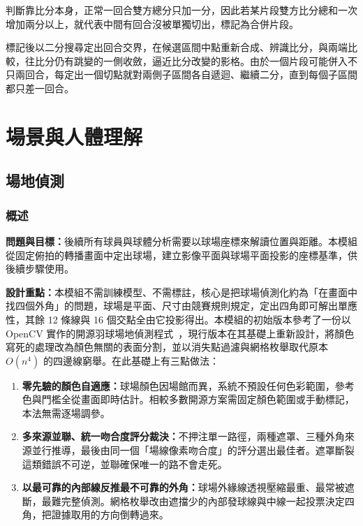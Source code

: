 判斷靠比分本身，正常一回合雙方總分只加一分，因此若某片段雙方比分總和一次增加兩分以上，就代表中間有回合沒被單獨切出，標記為合併片段。

標記後以二分搜尋定出回合交界，在候選區間中點重新合成、辨識比分，與兩端比較，往比分仍有跳變的一側收斂，逼近比分改變的影格。由於一個片段可能併入不只兩回合，每定出一個切點就對兩側子區間各自遞迴、繼續二分，直到每個子區間都只差一回合。

\section{場景與人體理解}
\label{sec:scene-understanding}

\subsection{場地偵測}
\label{sec:court-detection}

\subsubsection{概述}

\textbf{問題與目標：}後續所有球員與球體分析需要以球場座標來解讀位置與距離。本模組從固定俯拍的轉播畫面中定出球場，建立影像平面與球場平面投影的座標基準，供後續步驟使用。

\textbf{設計重點：}本模組不需訓練模型、不需標註，核心是把球場偵測化約為「在畫面中找四個外角」的問題，球場是平面、尺寸由競賽規則規定，定出四角即可解出單應性，其餘 12 條線與 16 個交點全由它投影得出。本模組的初始版本參考了一份以 OpenCV 實作的開源羽球場地偵測程式~\cite{badmintoncv}，現行版本在其基礎上重新設計，將顏色寫死的處理改為顏色無關的表面分割，並以消失點過濾與網格枚舉取代原本 $O(n^4)$ 的四邊線窮舉。在此基礎上有三點做法：

\begin{enumerate}
  \item \textbf{零先驗的顏色自適應：}球場顏色因場館而異，系統不預設任何色彩範圍，參考色與門檻全從畫面即時估計。相較多數開源方案需固定顏色範圍或手動標記，本法無需逐場調參。
  \item \textbf{多來源並聯、統一吻合度評分裁決：}不押注單一路徑，兩種遮罩、三種外角來源並行推導，最後由同一個「場線像素吻合度」的評分選出最佳者。遮罩斷裂這類錯誤不可逆，並聯確保唯一的路不會走死。
  \item \textbf{以最可靠的內部線反推最不可靠的外角：}球場外緣線透視壓縮最重、最常被遮斷，最難完整偵測。網格枚舉改由遮擋少的內部發球線與中線一起投票決定四角，把證據取用的方向倒轉過來。
\end{enumerate}

